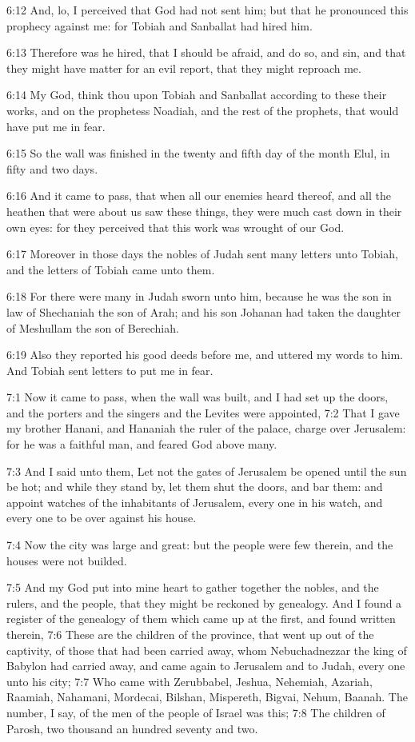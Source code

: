 6:12 And, lo, I perceived that God had not sent him; but that he pronounced this prophecy against me: for Tobiah and Sanballat had hired him.

6:13 Therefore was he hired, that I should be afraid, and do so, and sin, and that they might have matter for an evil report, that they might reproach me.

6:14 My God, think thou upon Tobiah and Sanballat according to these their works, and on the prophetess Noadiah, and the rest of the prophets, that would have put me in fear.

6:15 So the wall was finished in the twenty and fifth day of the month Elul, in fifty and two days.

6:16 And it came to pass, that when all our enemies heard thereof, and all the heathen that were about us saw these things, they were much cast down in their own eyes: for they perceived that this work was wrought of our God.

6:17 Moreover in those days the nobles of Judah sent many letters unto Tobiah, and the letters of Tobiah came unto them.

6:18 For there were many in Judah sworn unto him, because he was the son in law of Shechaniah the son of Arah; and his son Johanan had taken the daughter of Meshullam the son of Berechiah.

6:19 Also they reported his good deeds before me, and uttered my words to him. And Tobiah sent letters to put me in fear.

7:1 Now it came to pass, when the wall was built, and I had set up the doors, and the porters and the singers and the Levites were appointed, 7:2 That I gave my brother Hanani, and Hananiah the ruler of the palace, charge over Jerusalem: for he was a faithful man, and feared God above many.

7:3 And I said unto them, Let not the gates of Jerusalem be opened until the sun be hot; and while they stand by, let them shut the doors, and bar them: and appoint watches of the inhabitants of Jerusalem, every one in his watch, and every one to be over against his house.

7:4 Now the city was large and great: but the people were few therein, and the houses were not builded.

7:5 And my God put into mine heart to gather together the nobles, and the rulers, and the people, that they might be reckoned by genealogy.  And I found a register of the genealogy of them which came up at the first, and found written therein, 7:6 These are the children of the province, that went up out of the captivity, of those that had been carried away, whom Nebuchadnezzar the king of Babylon had carried away, and came again to Jerusalem and to Judah, every one unto his city; 7:7 Who came with Zerubbabel, Jeshua, Nehemiah, Azariah, Raamiah, Nahamani, Mordecai, Bilshan, Mispereth, Bigvai, Nehum, Baanah. The number, I say, of the men of the people of Israel was this; 7:8 The children of Parosh, two thousand an hundred seventy and two.

